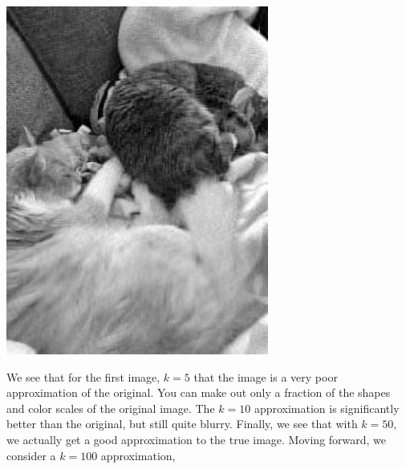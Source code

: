 \documentclass[letterpaper,12pt]{article}
\begin{document}
\begin{center}
\includegraphics[scale=.4]{grey50.png}
\end{center}
We see that for the first image, $k=5$ that the image is a very poor approximation of the original. You can make out only a fraction of the shapes and color scales of the original image. The $k=10$ approximation is significantly better than the original, but still quite blurry. Finally, we see that with $k=50$, we actually get a good approximation to the true image. Moving forward, we consider a $k=100$ approximation,
\end{document}
